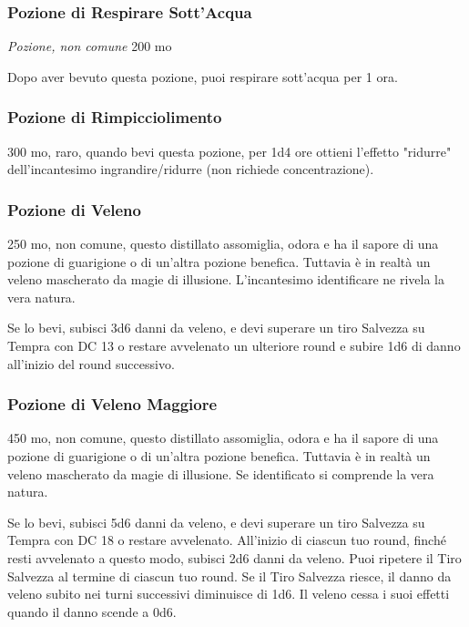 \begin{multicols}{2}
\subsubsection*{Pozione di Respirare Sott'Acqua} \textit{Pozione, non comune} 200 mo

Dopo aver bevuto questa pozione, puoi respirare sott'acqua per 1 ora.

\subsubsection*{Pozione di Rimpicciolimento}
300 mo, raro, quando bevi questa pozione, per 1d4 ore ottieni l'effetto "ridurre" dell'incantesimo ingrandire/ridurre (non richiede concentrazione).

\subsubsection*{Pozione di Veleno}
250 mo, non comune, questo distillato assomiglia, odora e ha il sapore di una pozione di guarigione o di un'altra pozione benefica. Tuttavia è in realtà un veleno mascherato da magie di illusione. L'incantesimo identificare ne rivela la vera natura.

Se lo bevi, subisci 3d6 danni da veleno, e devi superare un tiro Salvezza su Tempra con DC 13 o restare avvelenato un ulteriore round e subire 1d6 di danno all'inizio del round successivo.

\subsubsection*{Pozione di Veleno Maggiore}
450 mo, non comune, questo distillato assomiglia, odora e ha il sapore di una pozione di guarigione o di un'altra pozione benefica. Tuttavia è in realtà un veleno mascherato da magie di illusione. Se identificato si comprende la vera natura.

Se lo bevi, subisci 5d6 danni da veleno, e devi superare un tiro Salvezza su Tempra con DC 18 o restare avvelenato. All'inizio di ciascun tuo round, finché resti avvelenato a questo modo, subisci 2d6 danni da veleno. Puoi ripetere il Tiro Salvezza al termine di ciascun tuo round. Se il Tiro Salvezza riesce, il danno da veleno subito nei turni successivi diminuisce di 1d6. Il veleno cessa i suoi effetti quando il danno scende a 0d6.


\end{multicols}
